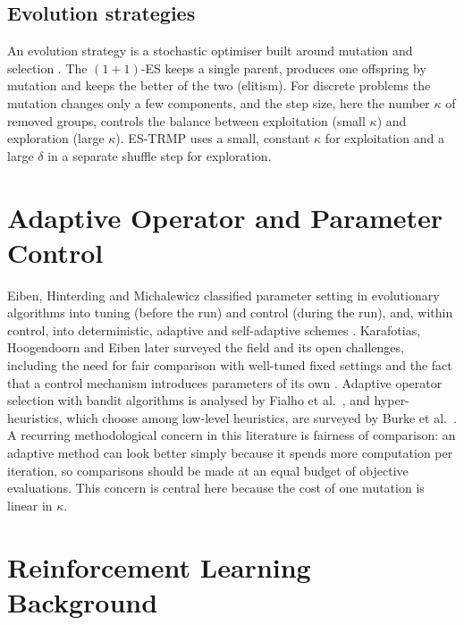 \subsection{Evolution strategies}

An evolution strategy is a stochastic optimiser built around mutation and selection \cite{beyer2002}. The $(1+1)$-ES keeps a single parent, produces one offspring by mutation and keeps the better of the two (elitism). For discrete problems the mutation changes only a few components, and the step size, here the number $\kappa$ of removed groups, controls the balance between exploitation (small $\kappa$) and exploration (large $\kappa$). ES-TRMP uses a small, constant $\kappa$ for exploitation and a large $\delta$ in a separate shuffle step for exploration.


\section{Adaptive Operator and Parameter Control}\label{sec:lit-adapt}

Eiben, Hinterding and Michalewicz classified parameter setting in evolutionary algorithms into tuning (before the run) and control (during the run), and, within control, into deterministic, adaptive and self-adaptive schemes \cite{eiben1999}. Karafotias, Hoogendoorn and Eiben later surveyed the field and its open challenges, including the need for fair comparison with well-tuned fixed settings and the fact that a control mechanism introduces parameters of its own \cite{karafotias2015}. Adaptive operator selection with bandit algorithms is analysed by Fialho et al.\ \cite{fialho2010}, and hyper-heuristics, which choose among low-level heuristics, are surveyed by Burke et al.\ \cite{burke2013}. A recurring methodological concern in this literature is fairness of comparison: an adaptive method can look better simply because it spends more computation per iteration, so comparisons should be made at an equal budget of objective evaluations. This concern is central here because the cost of one mutation is linear in $\kappa$.


\section{Reinforcement Learning Background}\label{sec:lit-rl}

